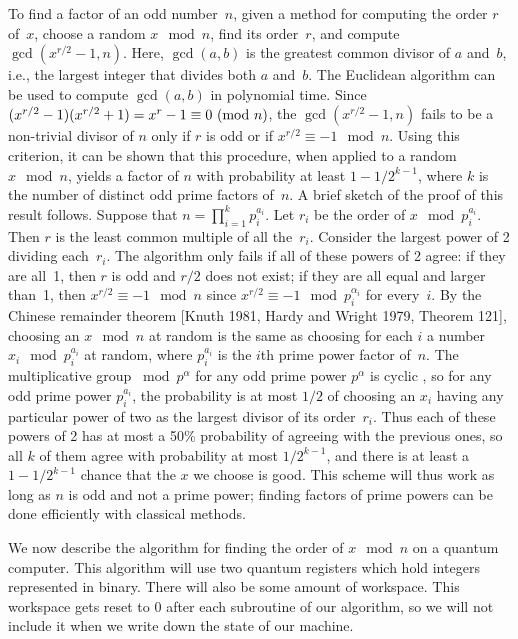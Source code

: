 To find a factor of an odd number~$n$, given a method for computing
the order $r$ of~$x$, choose a random $x \mod{n}$,
find its order~$r$, and compute $\gcd(x^{r/2}-1,n)$.  Here,
$\gcd(a,b)$ is the greatest common divisor of $a$ and~$b$, i.e.,
the largest integer that divides both $a$ and~$b$.  The  
Euclidean algorithm \cite{Knut} can be used to compute $\gcd(a,b)$
in polynomial time.  Since
$(x^{r/2}-1)\linebreak[1](x^{r/2}+1) = x^{r}-1 \equiv 0 \mod{n}$, 
the $\gcd(x^{r/2}-1,n)$ fails to be
a non-trivial divisor of $n$ only if $r$ is odd or if $x^{r/2} 
\equiv -1 \mod{n}$.  Using this criterion, it can be shown that this 
procedure, when applied to a random~$x \mod{n}$,
yields a factor of $n$ with probability 
at least $1-1/2^{k-1}$, where $k$
is the number of distinct odd prime factors of~$n$.  A brief sketch of the
proof of this result follows.  Suppose that $n = \prod_{i=1}^{k} p_i^{a_i}$. 
Let $r_i$ be the order of $x \mod{p_i^{a_i}}$. 
Then $r$ is the least common multiple of all the~$r_i$.  
Consider the largest power of 2 dividing each~$r_i$.   The algorithm
only fails if all of these powers of 2 agree: if they are all~1, then
$r$ is odd and $r/2$ does not exist; if they are all equal and 
larger than~1, then
$x^{r/2} \equiv -1 \mod{n}$ since $x^{r/2} \equiv -1 \mod{p_i^{\alpha_i}}$
for every~$i$.  By the Chinese remainder
theorem [Knuth 1981, Hardy and Wright 1979, Theorem 121], choosing an 
$x \mod{n}$ at random is the same as choosing 
for each $i$ a number $x_i \mod{p_i^{a_i}}$ at random, where $p_i^{a_i}$ 
is the $i$th prime power
factor of~$n$.  The multiplicative group $\bmod{p^{\alpha}}$ for
any odd prime power $p^{\alpha}$ is
cyclic \cite{Knut}, so for any odd prime power $p_i^{a_i}$, the 
probability is at most $1/2$ of 
choosing an $x_i$ having any particular power of two as the largest divisor 
of its order~$r_i$.
Thus each of these powers of 2 has at most a 50\% probability
of agreeing with the previous ones, so all $k$ of them agree with
probability at most $1/2^{k-1}$,
and there is at least a $1-1/2^{k-1}$ chance that the $x$ we choose
is good.
This scheme will thus
work as long as $n$ is odd and not a prime power; finding factors of 
prime powers can be done efficiently with classical methods.


We now describe the algorithm for finding the 
order of $x \mod{n}$ on a quantum computer.
This algorithm will use two quantum registers which hold integers represented
in binary.  There will also be some amount of workspace.  This workspace
gets reset to 0 after each subroutine of our algorithm, so we will 
not include it when we write down the state of our machine. 

